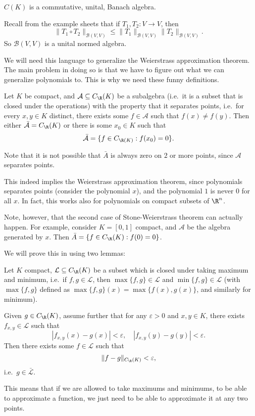 \documentclass[a4paper]{article}
\begin{document}
\begin{eg}
  $C(K)$ is a commutative, unital, Banach algebra.
\end{eg}

\begin{eg}
  Recall from the example sheets that if $T_1, T_2: V\to V$, then
  \[
    \|T_1 \circ T_2\|_{\mathcal{B}(V, V)} \leq \|T_1\|_{\mathcal{B}(V, V)}\|T_2\|_{\mathcal{B}(V, V)}.
  \]
  So $\mathcal{B}(V, V)$ is a unital normed algebra.
\end{eg}

We will need this language to generalize the Weierstrass approximation theorem. The main problem in doing so is that we have to figure out what we can generalize polynomials to. This is why we need these funny definitions.

\begin{thm}
  Let $K$ be compact, and $\mathcal{A} \subseteq C_{\R}(K)$ be a subalgebra (i.e.\ it is a subset that is closed under the operations) with the property that it separates points, i.e.\ for every $x, y \in K$ distinct, there exists some $f \in \mathcal{A}$ such that $f(x) \not= f(y)$. Then either $\bar{\mathcal{A}} = C_\R(K)$ or there is some $x_0 \in K$ such that
  \[
    \bar{\mathcal{A}} = \{f \in C_{\R(K)}: f(x_0) = 0\}.
  \]
\end{thm}
Note that it is not possible that $\bar{A}$ is always zero on $2$ or more points, since $\mathcal{A}$ separates points.

This indeed implies the Weierstrass approximation theorem, since polynomials separates points (consider the polynomial $x$), and the polynomial $1$ is never $0$ for all $x$. In fact, this works also for polynomials on compact subsets of $\R^n$.

Note, however, that the second case of Stone-Weierstrass theorem can actually happen. For example, consider $K = [0, 1]$ compact, and $\mathcal{A}$ be the algebra generated by $x$. Then $\bar{A} = \{f \in C_\R(K): f(0) = 0\}$.

We will prove this in using two lemmas:
\begin{lemma}
  Let $K$ compact, $\mathcal{L} \subseteq C_\R(K)$ be a subset which is closed under taking maximum and minimum, i.e.\ if $f, g \in \mathcal{L}$, then $\max\{f, g\} \in \mathcal{L}$ and $\min \{f, g\} \in \mathcal{L}$ (with $\max\{f, g\}$ defined as $\max\{f, g\}(x) = \max\{f(x), g(x)\}$, and similarly for minimum).

  Given $g \in C_\R(K)$, assume further that for any $\varepsilon > 0$ and $x, y \in K$, there exists $f_{x, y} \in \mathcal{L}$ such that
  \[
    |f_{x, y}(x) - g(x)| < \varepsilon,\quad |f_{x, y}(y) - g(y)| < \varepsilon.
  \]
  Then there exists some $f \in \mathcal{L}$ such that
  \[
    \|f - g\|_{C_\R(K)} < \varepsilon,
  \]
  i.e.\ $g \in \bar{\mathcal{L}}$.
\end{lemma}
This means that if we are allowed to take maximums and minimums, to be able to approximate a function, we just need to be able to approximate it at any two points.
\end{document}
